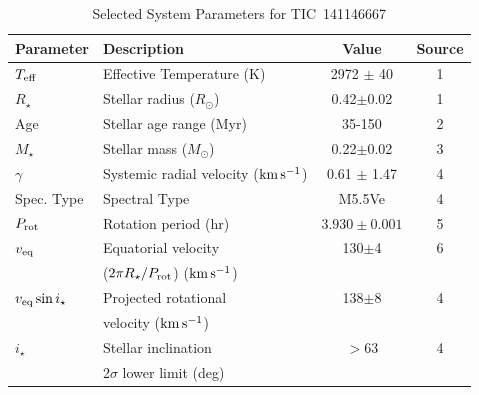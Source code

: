 \documentclass{nature3}
\newcommand{\kms}{\ensuremath{\rm km\,s^{-1}}}
\begin{document}
\begin{table}
\small
\setlength{\tabcolsep}{2pt}
\centering
\caption{Selected System Parameters for TIC~141146667}
\label{tab:params}
\begin{tabular}{llcc}
\hline \hline
Parameter & Description & Value & Source\\
\hline 
%
$T_{\rm eff}$\dotfill                   & Effective Temperature (K) \hspace{9pt}\dotfill                 & 2972 $\pm$ 40    & 1 \\
%
$R_\star$\dotfill                       & Stellar radius ($R_\odot$)\dotfill                             & 0.42$\pm$0.02    & 1 \\
%
Age                                     & Stellar age range (Myr)\dotfill                                & 35-150           & 2 \\
%
$M_\star$\dotfill                       & Stellar mass ($M_\odot$)\dotfill                               & 0.22$\pm$0.02    & 3 \\
%
$\gamma$\dotfill                        & Systemic radial velocity (\kms)\dotfill                        & 0.61 $\pm$ 1.47  & 4 \\
%
Spec. Type\dotfill                      & Spectral Type\dotfill                                          & M5.5Ve           & 4 \\
%
$P_{\rm rot}$\dotfill                   & Rotation period (hr)\dotfill                                   & $3.930\pm 0.001$ & 5 \\
%
$v_{\rm eq}$\dotfill		                & Equatorial velocity \dotfill                                   &  130$\pm$4       & 6 \\
                                        & \hspace{3pt} ($2\pi R_\star/P_{\rm rot}$) (\kms)	             &                      \\
%
$v_{\rm eq}\sin{i_\star}$\dotfill		    & Projected rotational\dotfill                                   &  138$\pm$8       & 4 \\
                                        & \hspace{3pt} velocity (\kms)	                                 &                      \\
%
$i_\star$\dotfill                       & Stellar inclination\dotfill                                    & 	$>$63           & 4 \\
                                        & \hspace{3pt}  2$\sigma$ lower limit (deg)	                     &                      \\

\end{tabular}
\end{table}
\end{document}
